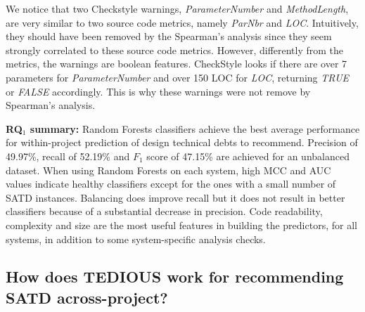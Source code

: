 We notice that two Checkstyle warnings, \textit{ParameterNumber} and \textit{MethodLength}, are very similar to two source code metrics, namely \textit{ParNbr} and \textit{LOC}. Intuitively, they should have been removed by the Spearman's analysis since they seem strongly correlated to these source code metrics. However, differently from the metrics, the warnings are boolean features. CheckStyle looks if there are over 7 parameters for \textit{ParameterNumber} and over 150 LOC for \textit{LOC}, returning \textit{TRUE} or \textit{FALSE} accordingly. This is why these warnings were not remove by Spearman's analysis.

\begin{mdframed}
	{\bf RQ$_1$ summary:} Random Forests classifiers achieve the best average performance for within-project prediction of design technical debts to recommend. Precision of 49.97\%, recall of 52.19\% and $F_1$ score of 47.15\% are achieved for an unbalanced dataset. When using Random Forests on each system, high MCC and AUC values indicate healthy classifiers except for the ones with a small number of SATD instances. Balancing does improve recall but it does not result in better classifiers because of a substantial decrease in precision. Code readability, complexity and size are the most useful features in building the predictors, for all systems, in addition to some system-specific analysis checks.
\end{mdframed}

\subsection{How does TEDIOUS work for recommending SATD across-project?}


